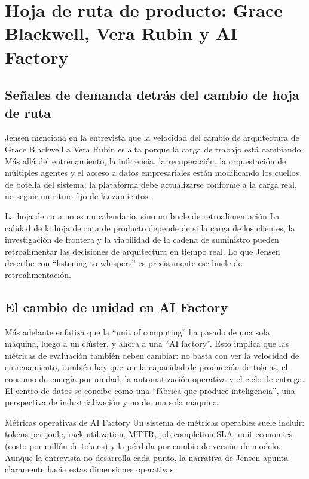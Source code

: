 \section{Hoja de ruta de producto: Grace Blackwell, Vera Rubin y AI Factory}

\subsection{Señales de demanda detrás del cambio de hoja de ruta}

Jensen menciona en la entrevista que la velocidad del cambio de arquitectura de Grace Blackwell a Vera Rubin es alta porque la carga de trabajo está cambiando. Más allá del entrenamiento, la inferencia, la recuperación, la orquestación de múltiples agentes y el acceso a datos empresariales están modificando los cuellos de botella del sistema; la plataforma debe actualizarse conforme a la carga real, no seguir un ritmo fijo de lanzamientos.

\begin{importantbox}{La hoja de ruta no es un calendario, sino un bucle de retroalimentación}
La calidad de la hoja de ruta de producto depende de si la carga de los clientes, la investigación de frontera y la viabilidad de la cadena de suministro pueden retroalimentar las decisiones de arquitectura en tiempo real. Lo que Jensen describe con ``listening to whispers'' es precisamente ese bucle de retroalimentación.
\end{importantbox}

\subsection{El cambio de unidad en AI Factory}

Más adelante enfatiza que la ``unit of computing'' ha pasado de una sola máquina, luego a un clúster, y ahora a una ``AI factory''. Esto implica que las métricas de evaluación también deben cambiar: no basta con ver la velocidad de entrenamiento, también hay que ver la capacidad de producción de tokens, el consumo de energía por unidad, la automatización operativa y el ciclo de entrega. El centro de datos se concibe como una ``fábrica que produce inteligencia'', una perspectiva de industrialización y no de una sola máquina.

\begin{knowledgebox}{Métricas operativas de AI Factory}
Un sistema de métricas operables suele incluir: tokens per joule, rack utilization, MTTR, job completion SLA, unit economics (costo por millón de tokens) y la pérdida por cambio de versión de modelo. Aunque la entrevista no desarrolla cada punto, la narrativa de Jensen apunta claramente hacia estas dimensiones operativas.
\end{knowledgebox}

